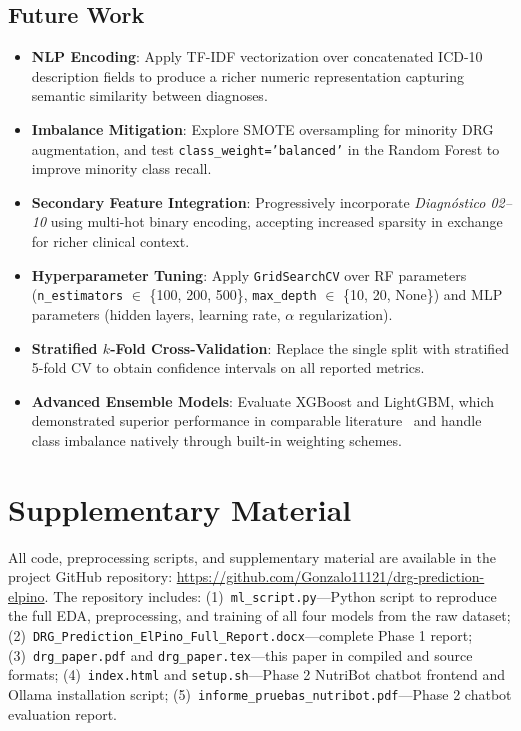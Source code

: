 \documentclass{IEEEtran}
\begin{document}
\subsection{Future Work}
\begin{itemize}
    \item \textbf{NLP Encoding}: Apply TF-IDF vectorization over concatenated ICD-10 description fields to produce a richer numeric representation capturing semantic similarity between diagnoses.
    \item \textbf{Imbalance Mitigation}: Explore SMOTE oversampling for minority DRG augmentation, and test \texttt{class\_weight='balanced'} in the Random Forest to improve minority class recall.
    \item \textbf{Secondary Feature Integration}: Progressively incorporate \textit{Diagn\'ostico 02--10} using multi-hot binary encoding, accepting increased sparsity in exchange for richer clinical context.
    \item \textbf{Hyperparameter Tuning}: Apply \texttt{GridSearchCV} over RF parameters (\texttt{n\_estimators} $\in$ \{100, 200, 500\}, \texttt{max\_depth} $\in$ \{10, 20, None\}) and MLP parameters (hidden layers, learning rate, $\alpha$ regularization).
    \item \textbf{Stratified $k$-Fold Cross-Validation}: Replace the single split with stratified 5-fold CV to obtain confidence intervals on all reported metrics.
    \item \textbf{Advanced Ensemble Models}: Evaluate XGBoost and LightGBM, which demonstrated superior performance in comparable literature~\cite{yu2022} and handle class imbalance natively through built-in weighting schemes.
\end{itemize}

\section*{Supplementary Material}

All code, preprocessing scripts, and supplementary material are available in the project GitHub repository: \url{https://github.com/Gonzalo11121/drg-prediction-elpino}. The repository includes: (1)~\texttt{ml\_script.py}---Python script to reproduce the full EDA, preprocessing, and training of all four models from the raw dataset; (2)~\texttt{DRG\_Prediction\_ElPino\_Full\_Report.docx}---complete Phase 1 report; (3)~\texttt{drg\_paper.pdf} and \texttt{drg\_paper.tex}---this paper in compiled and source formats; (4)~\texttt{index.html} and \texttt{setup.sh}---Phase 2 NutriBot chatbot frontend and Ollama installation script; (5)~\texttt{informe\_pruebas\_nutribot.pdf}---Phase 2 chatbot evaluation report.
\end{document}
